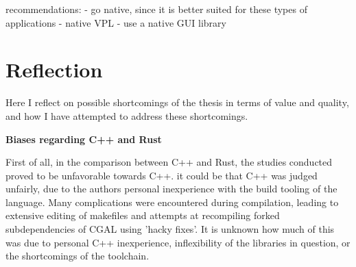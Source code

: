 





\begin{note}
  
recommendations: 
- go native, since it is better suited for these types of applications
  - native VPL 
  - use a native GUI library
\end{note}

\section{Reflection}
\label{sec:reflection}

Here I reflect on possible shortcomings of the thesis in terms of value and quality, and how I have attempted to address these shortcomings. 

\textbf{Biases regarding C++ and Rust}

First of all, in the comparison between C++ and Rust, the studies conducted proved to be unfavorable towards C++. 
it could be that C++ was judged unfairly, due to the authors personal inexperience with the build tooling of the language. 
Many complications were encountered during compilation, leading to extensive editing of makefiles and attempts at recompiling forked subdependencies of CGAL using 'hacky fixes'.  
It is unknown how much of this was due to personal C++ inexperience, inflexibility of the libraries in question, or the shortcomings of the toolchain. 

